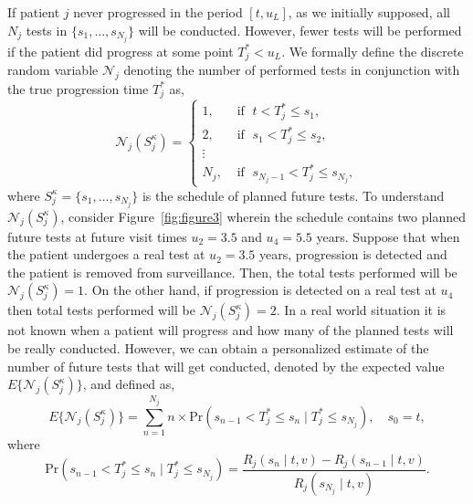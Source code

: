 \documentclass[AMA,STIX1COL]{WileyNJD-v2}
\begin{document}
If patient $j$ never progressed in the period $[t, u_L]$, as we initially supposed, all $N_j$ tests in $\{s_1, \ldots, s_{N_j}\}$ will be conducted. However, fewer tests will be performed if the patient did progress at some point $T_j^* < u_L$. We formally define the discrete random variable $\mathcal{N}_j$ denoting the number of performed tests in conjunction with the true progression time $T_j^*$ as,
\[
\mathcal{N}_j (S^\kappa_j) = \left \{
\begin{array}{ll}
1, & \mbox{ if } \; t < T^*_j \leq s_1,\\
2, & \mbox{ if } \; s_1 < T^*_j \leq s_2,\\
\vdots&\\
N_j, & \mbox{ if } \; s_{N_j-1} < T^*_j \leq s_{N_j},
\end{array}
\right.
\]
where $S^\kappa_j = \{s_1, \ldots, s_{N_j}\}$ is the schedule of planned future tests. To understand $\mathcal{N}_j (S^\kappa_j)$, consider Figure~\ref{fig:figure3} wherein the schedule contains two planned future tests at future visit times $u_2 = 3.5$ and $u_4 = 5.5$ years. Suppose that when the patient undergoes a real test at $u_2 = 3.5$ years, progression is detected and the patient is removed from surveillance. Then, the total tests performed will be $\mathcal{N}_j (S^\kappa_j) = 1$. On the other hand, if progression is detected on a real test at $u_4$ then total tests performed will be $\mathcal{N}_j (S^\kappa_j) = 2$. In a real world situation it is not known when a patient will progress and how many of the planned tests will be really conducted. However, we can obtain a personalized estimate of the number of future tests that will get conducted, denoted by the expected value $E \big \{\mathcal N_j(S^\kappa_j)\big\}$, and defined as,
\begin{equation}
\label{eq:exp_tests}
E \big \{\mathcal N_j(S^\kappa_j)\big\} = \sum_{n = 1}^{N_j} n \times \mbox{Pr}(s_{n-1} < T^*_j \leq s_n \mid T^*_j \leq s_{N_j}), \quad s_0 = t,
\end{equation}
where 
\begin{equation*}
\mbox{Pr}(s_{n-1} < T^*_j \leq s_n \mid T^*_j \leq s_{N_j}) = \frac{R_j(s_n \mid t, v) - R_j(s_{n-1} \mid t, v)}{R_j(s_{N_j} \mid t, v)}.
\end{equation*}
\end{document}

